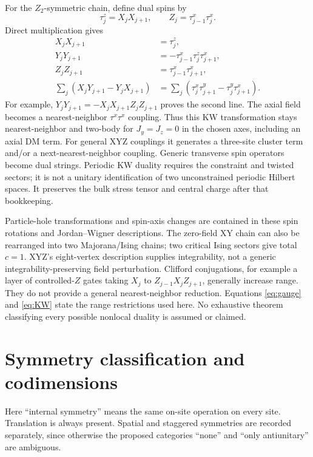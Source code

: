 \documentclass[11pt]{article}
\begin{document}
For the $Z_2$-symmetric chain, define dual spins by
\begin{equation}
 \tau_j^z=X_jX_{j+1},\qquad Z_j=\tau_{j-1}^x\tau_j^x.
\end{equation}
Direct multiplication gives
\begin{align}
 X_jX_{j+1}&=\tau_j^z,\\
 Y_jY_{j+1}&=-\tau_{j-1}^x\tau_j^z\tau_{j+1}^x,\\
 Z_jZ_{j+1}&=\tau_{j-1}^x\tau_{j+1}^x,\\
 \sum_j(X_jY_{j+1}-Y_jX_{j+1})
 &=\sum_j(\tau_j^x\tau_{j+1}^y-\tau_j^y\tau_{j+1}^x).
 \label{eq:KW}
\end{align}
For example, $Y_jY_{j+1}=-X_jX_{j+1}Z_jZ_{j+1}$ proves the second line.
The axial field becomes a nearest-neighbor $\tau^x\tau^x$ coupling. Thus this
KW transformation stays nearest-neighbor and two-body for
$J_y=J_z=0$ in the chosen axes, including an axial DM term. For general XYZ
couplings it generates a three-site cluster term and/or a next-nearest-neighbor
coupling. Generic transverse spin operators become dual strings. Periodic KW
duality requires the constraint and twisted sectors; it is not a unitary
identification of two unconstrained periodic Hilbert spaces. It preserves the
bulk stress tensor and central charge after that bookkeeping.

Particle-hole transformations and spin-axis changes are contained in these
spin rotations and Jordan--Wigner descriptions. The zero-field XY chain can
also be rearranged into two Majorana/Ising chains; two critical Ising sectors
give total $c=1$. XYZ's eight-vertex description supplies integrability, not a
generic integrability-preserving field perturbation. Clifford conjugations,
for example a layer of controlled-$Z$ gates taking $X_j$ to
$Z_{j-1}X_jZ_{j+1}$, generally increase range. They do not provide a general
nearest-neighbor reduction. Equations \eqref{eq:gauge} and \eqref{eq:KW} state
the range restrictions used here. No exhaustive theorem classifying every
possible nonlocal duality is assumed or claimed.

\section{Symmetry classification and codimensions}

Here ``internal symmetry'' means the same on-site operation on every site.
Translation is always present. Spatial and staggered symmetries are recorded
separately, since otherwise the proposed categories ``none'' and ``only
antiunitary'' are ambiguous.
\end{document}
